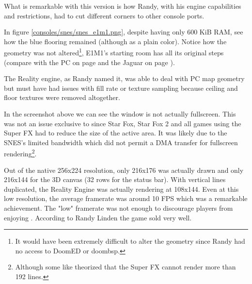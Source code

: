 What is remarkable with this version is how Randy, with his engine capabilities and restrictions, had to cut different corners to other console ports.\\
\par
{}
\par
\vspace{-10pt}
In figure \ref{consoles/snes/snes_e1m1.png}, despite having only 600 KiB RAM, see how the blue flooring remained (although as a plain color). Notice how the geometry was not altered\footnote{It would have been extremely difficult to alter the geometry since Randy had no access to DoomED or doombsp.}, E1M1's starting room has all its original steps (compare with the PC on page \pageref{mashed_potatoes1.png} and the Jaguar on page \pageref{doom_jaguar3.png}).\\
\par The Reality engine, as Randy named it, was able to deal with PC map geometry but must have had issues with fill rate or texture sampling because ceiling and floor textures were removed altogether.













\par
\vspace{-10pt}
In the screenshot above we can see the window is not actually fullscreen. This was not an issue exclusive to \doom{} since Star Fox, Star Fox 2 and all games using the Super FX had to reduce the size of the active area. It was likely due to the SNES's limited bandwidth which did not permit a DMA transfer for fullscreen rendering\footnote{Although some like  theorized that the Super FX cannot render more than 192 lines.}.\\
\par
Out of the native 256x224 resolution, only 216x176 was actually drawn and only 216x144 for the 3D canvas (32 rows for the status bar). With vertical lines duplicated, the Reality Engine was actually rendering at 108x144. Even at this low resolution, the average framerate was around 10 FPS which was a remarkable achievement. The "low" framerate was not enough to discourage players from enjoying \doom. According to Randy Linden the game sold very well.







